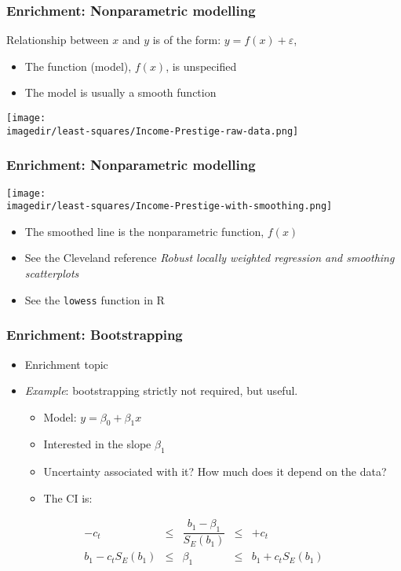\begin{frame}\frametitle{Enrichment: Nonparametric modelling}

	Relationship between $x$ and $y$ is of the form: $y = f(x) + \varepsilon$,
	\begin{itemize}
		\item	The function (model), $f(x)$, is unspecified
		\item	The model is usually a smooth function
	\end{itemize}
	\vspace{-12pt}
	\begin{center}
		\texttt{[image: \\imagedir/least-squares/Income-Prestige-raw-data.png]}
	\end{center}
\end{frame}

\begin{frame}\frametitle{Enrichment: Nonparametric modelling}
	\begin{center}
		\texttt{[image: \\imagedir/least-squares/Income-Prestige-with-smoothing.png]}
	\end{center}
	\begin{itemize}
		\item	The smoothed line is the nonparametric function, $f(x)$
		\item	See the Cleveland reference \emph{Robust locally weighted regression and smoothing scatterplots}
		\item	See the \texttt{lowess} function in R
	\end{itemize}
\end{frame}

\begin{frame}\frametitle{Enrichment: Bootstrapping}
	\begin{itemize}
		\item	Enrichment topic
		\item	\emph{Example}: bootstrapping strictly not required, but useful.
		\begin{itemize}
			\item	Model: $y = \beta_0 + \beta_1 x$
			\item	Interested in the slope $\beta_1$
			\item	Uncertainty associated with it? How much does it depend on the data?
			\item	The CI is:
		\end{itemize}
	\end{itemize}
	$$
	\begin{array}{rcccl}
		- c_t &\leq& \dfrac{b_1 - \beta_1}{S_E(b_1)} &\leq & +c_t\\
		b_1 - c_t S_E(b_1) &\leq& \beta_1 &\leq& b_1 + c_t S_E(b_1)
	\end{array}
	$$
\end{frame}

